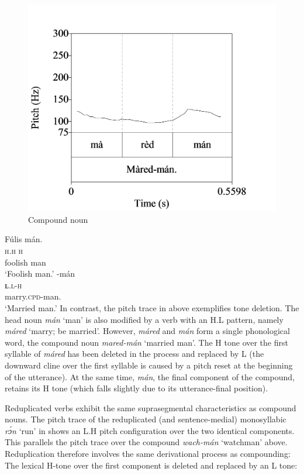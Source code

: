 \begin{figure}
\caption{Compound noun}
\label{fig:key:3.20}
\includegraphics[height=.3\textheight]{figures/yakpomod-img22.png} 
\end{figure}

\ea\label{ex:key:58}
\glll   Fúlis  mán.\\
\textsc{h.h}    \textsc{h}\\
foolish  man\\
\glt   ‘Foolish man.’ 
\z
\ea\label{ex:key:59}
\glll    {}-mán\\
\textbf{\textsc{l}}.\textsc{l-h}\\
marry.\textsc{cpd}{}-man.\\
\glt ‘Married man.’
\z
In contrast, the pitch trace in  above exemplifies tone deletion. The head noun \textit{mán} ‘man’ is also modified by a verb with an H.L pattern, namely \textit{máred} ‘marry; be married’. However, \textit{máred} and \textit{mán} form a single phonological word, the compound noun \textit{mared-mán} ‘married man’. The H tone over the first syllable of \textit{máred} has been deleted in the process and replaced by L (the downward cline over the first syllable is caused by a pitch reset at the beginning of the utterance). At the same time, \textit{mán}, the final component of the compound, retains its H tone (which falls slightly due to its utterance-final position).


Reduplicated verbs exhibit the same suprasegmental characteristics as compound nouns. The pitch trace of the reduplicated (and sentence-medial) monosyllabic \textit{rɔ́n} ‘run’ in  shows an L.H pitch configuration over the two identical components. This parallels the pitch trace over the compound \textit{wach-mán} ‘watchman’ above. Reduplication therefore involves the same derivational process as compounding: The lexical H-tone over the first component is deleted and replaced by an L tone: 


